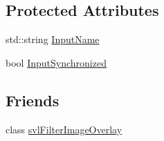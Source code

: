\subsection*{Protected Attributes}
\begin{DoxyCompactItemize}
\item 
std\-::string \hyperlink{classsvl_overlay_input_a193d910ca5ced17419e6c0bd51169265}{Input\-Name}
\item 
bool \hyperlink{classsvl_overlay_input_a16cf008dbd4809ec1ccf0e9b28ac6d3a}{Input\-Synchronized}
\end{DoxyCompactItemize}
\subsection*{Friends}
\begin{DoxyCompactItemize}
\item 
class \hyperlink{classsvl_overlay_input_a83f118ae07b7352f907d08378ed1e2a8}{svl\-Filter\-Image\-Overlay}
\end{DoxyCompactItemize}


